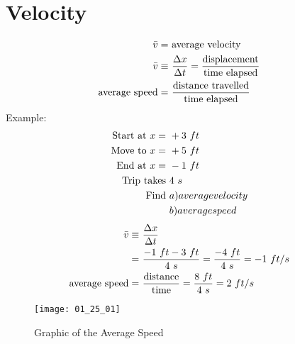 \section{Velocity}
	\begin{align}
		\bar{v} = \ &\text{average velocity}& \notag \\
		\bar{v} \equiv \ &\frac{\Delta x}{\Delta t} = \frac{\text{displacement}}{\text{time elapsed}}& \notag \\
		\text{average speed} = \ &\frac{\text{distance travelled}}{\text{time elapsed}}& \notag
	\end{align}
	Example:
	\begin{align}
		\text{Start at } x = \ &+3 \ ft& \notag \\
		\text{Move to } x = \ &+5 \ ft& \notag \\
		\text{End at } x = \ &-1 \ ft& \notag \\
		\text{Trip takes } &4 \ s& \notag \\
		\text{Find } &a) average velocity& \notag \\
		&b) average speed& \notag
	\end{align}
	\begin{align}
		\bar{v} \equiv \ &\frac{\Delta x}{\Delta t}& \notag \\
		= \ &\frac{-1 \ ft - 3 \ ft}{4 \ s} = \frac{-4 \ ft}{4 \ s} = -1 \ ft/s& \notag \\
		\text{average speed} = \ &\frac{\text{distance}}{\text{time}} = \frac{8 \ ft}{4 \ s} = 2 \ ft/s& \notag
	\end{align}

	\begin{figure}[H]
		\begin{center}
			\texttt{[image: 01\_25\_01]}
			\caption{Graphic of the Average Speed}
			\label{fig:01_25_01}
		\end{center}
	\end{figure}

